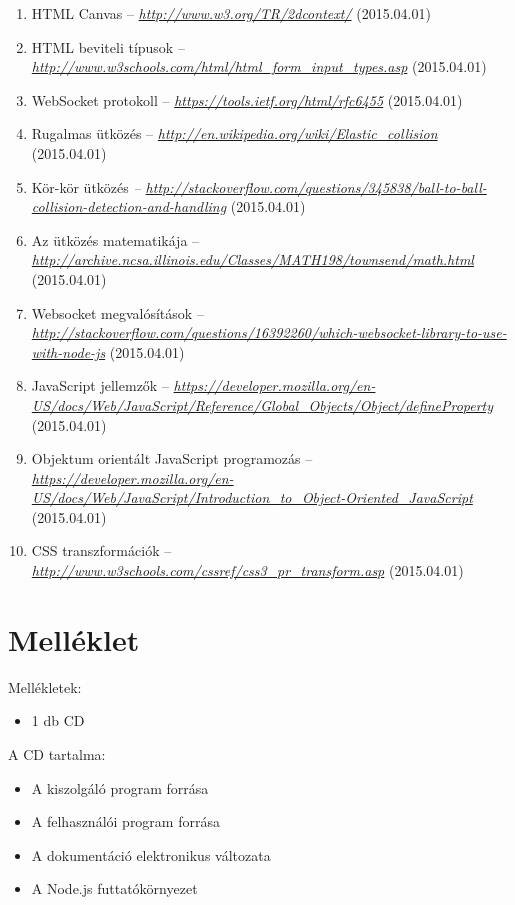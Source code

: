 \documentclass[]{article}
\begin{document}
\begin{enumerate}
\def\labelenumi{\arabic{enumi}.}
\item
  HTML Canvas --
  \href{http://www.w3.org/TR/2dcontext/}{\emph{http://www.w3.org/TR/2dcontext/}}
  (2015.04.01)
\item
  HTML beviteli típusok --
  \href{http://www.w3schools.com/html/html_form_input_types.asp}{\emph{http://www.w3schools.com/html/html\_form\_input\_types.asp}}
  (2015.04.01)
\item
  WebSocket protokoll --
  \href{https://tools.ietf.org/html/rfc6455}{\emph{https://tools.ietf.org/html/rfc6455}}
  (2015.04.01)
\item
  Rugalmas ütközés --
  \href{http://en.wikipedia.org/wiki/Elastic_collision}{\emph{http://en.wikipedia.org/wiki/Elastic\_collision}}
  (2015.04.01)
\item
  Kör-kör ütközés \emph{--
  \href{http://stackoverflow.com/questions/345838/ball-to-ball-\%20collision-detection-and-handling}{http://stackoverflow.com/questions/345838/ball-to-ball-
  collision-detection-and-handling}} (2015.04.01)
\item
  Az ütközés matematikája --
  \emph{\url{http://archive.ncsa.illinois.edu/Classes/MATH198/townsend/math.html}}
  (2015.04.01)
\item
  Websocket megvalósítások --
  \href{http://stackoverflow.com/questions/16392260/which-websocket-library-to-use-with-node-js}{\emph{http://stackoverflow.com/questions/16392260/which-websocket-library-to-use-with-node-js}}
  (2015.04.01)
\item
  JavaScript jellemzők --
  \href{https://developer.mozilla.org/en-US/docs/Web/JavaScript/Reference/Global_Objects/Object/defineProperty}{\emph{https://developer.mozilla.org/en-US/docs/Web/JavaScript/Reference/Global\_Objects/Object/defineProperty}}
  (2015.04.01)
\item
  Objektum orientált JavaScript programozás --
  \emph{\url{https://developer.mozilla.org/en-US/docs/Web/JavaScript/Introduction_to_Object-Oriented_JavaScript}}
  (2015.04.01)
\item
  CSS transzformációk --
  \emph{\url{http://www.w3schools.com/cssref/css3_pr_transform.asp}}
  (2015.04.01)
\end{enumerate}

\hypertarget{melluxe9klet}{%
\section{Melléklet}\label{melluxe9klet}}

Mellékletek:

\begin{itemize}
\item
  1 db CD
\end{itemize}

A CD tartalma:

\begin{itemize}
\item
  A kiszolgáló program forrása
\item
  A felhasználói program forrása
\item
  A dokumentáció elektronikus változata
\item
  A Node.js futtatókörnyezet
\end{itemize}
\end{document}
